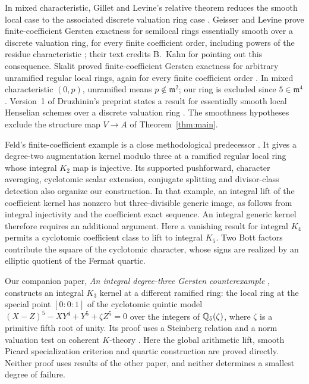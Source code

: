 In mixed characteristic, Gillet and Levine's relative theorem reduces
the smooth local case to the associated discrete valuation ring case
\cite{GilletLevine1987}. Geisser and Levine prove finite-coefficient
Gersten exactness for semilocal rings essentially smooth over a discrete
valuation ring, for every finite coefficient order, including powers of
the residue characteristic \cite[Theorem~8.2]{GeisserLevine2000}; their
text credits B.~Kahn for pointing out this consequence. Skalit proved
finite-coefficient Gersten exactness for arbitrary unramified regular
local rings, again for every finite coefficient order
\cite[Corollary~5.7]{Skalit2017}. In mixed characteristic $(0,p)$,
unramified means $p\notin\mathfrak m^2$; our ring is excluded since
$5\in\mathfrak m^4$. Version~1 of
Druzhinin's preprint states a result for essentially smooth local
Henselian schemes over a discrete valuation ring
\cite[Theorem~4.5]{Druzhinin2025}. The smoothness hypotheses exclude the
structure map $V\to A$ of Theorem~\ref{thm:main}.

Feld's finite-coefficient example is a close methodological predecessor
\cite[Theorem~1.1 and Corollary~5.1]{Feld2026}. It gives a degree-two
augmentation kernel modulo three at a ramified regular local ring whose
integral $K_2$ map is injective. Its supported pushforward, character
averaging, cyclotomic scalar extension, conjugate splitting and
divisor-class detection also organize our construction. In that example,
an integral lift of the coefficient kernel has nonzero but
three-divisible generic image, as follows from integral injectivity and
the coefficient exact sequence. An integral generic kernel therefore
requires an additional argument. Here a vanishing result for integral
$K_4$ permits a cyclotomic coefficient class to lift to integral $K_5$.
Two Bott factors contribute the square of the cyclotomic character,
whose signs are realized by an elliptic quotient of the Fermat quartic.

Our companion paper, \emph{An integral degree-three Gersten counterexample}
\cite[Theorem~1.1]{OpenAIDegreeThree2026}, constructs an integral
$K_3$ kernel at a different ramified ring: the local ring at the special
point $[0:0:1]$ of the cyclotomic quintic model
$(X-Z)^5-XY^4+Y^5+\zeta Z^5=0$ over the integers of $\mathbb Q_5(\zeta)$,
where $\zeta$ is a primitive fifth root of unity.
Its proof uses a Steinberg relation and a norm valuation test on coherent
$K$-theory \cite[Lemma~4.2, Proposition~3.1, and \S5]{OpenAIDegreeThree2026}.
Here the global arithmetic lift, smooth Picard specialization criterion
and quartic construction are proved directly. Neither proof uses results
of the other paper, and neither determines a smallest degree of failure.

